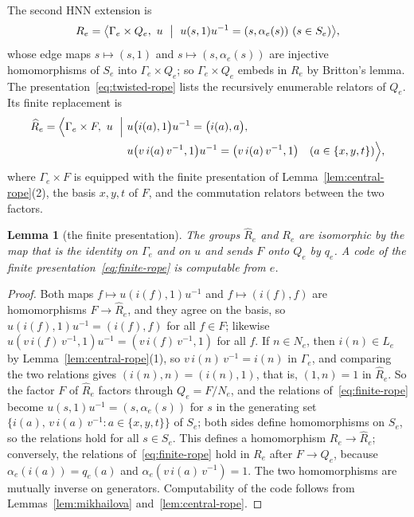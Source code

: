 \documentclass[11pt]{amsart}
\newtheorem{lemma}[theorem]{Lemma}
\theoremstyle{remark}
\theoremstyle{plain}
\begin{document}
The second HNN extension is
\begin{equation}\label{eq:twisted-rope}
 R_e=\bigl\langle\Gamma_e\times Q_e,\ u\ \bigm|\ u(s,1)u^{-1}=(s,\alpha_e(s))\ (s\in S_e)\bigr\rangle,
\end{equation}
whose edge maps $s\mapsto(s,1)$ and $s\mapsto(s,\alpha_e(s))$ are injective
homomorphisms of $S_e$ into $\Gamma_e\times Q_e$; so
$\Gamma_e\times Q_e$ embeds in $R_e$ by Britton's lemma.  The
presentation~\eqref{eq:twisted-rope} lists the recursively enumerable
relators of $Q_e$.  Its finite replacement is
\begin{equation}\label{eq:finite-rope}
\begin{aligned}
 \widehat R_e=\Bigl\langle\Gamma_e\times F,\ u\ \Bigm|\
 &u\bigl(i(a),1\bigr)u^{-1}=\bigl(i(a),a\bigr),\\
 &u\bigl(v\,i(a)\,v^{-1},1\bigr)u^{-1}=\bigl(v\,i(a)\,v^{-1},1\bigr)
 \quad(a\in\{x,y,t\})\Bigr\rangle,
\end{aligned}
\end{equation}
where $\Gamma_e\times F$ is equipped with the finite presentation of
Lemma~\ref{lem:central-rope}(2), the basis $x,y,t$ of $F$, and the
commutation relators between the two factors.

\begin{lemma}[the finite presentation]\label{lem:finite-rope}
The groups $\widehat R_e$ and $R_e$ are isomorphic by the map that is the
identity on $\Gamma_e$ and on $u$ and sends $F$ onto $Q_e$ by $q_e$.  A
code of the finite presentation~\eqref{eq:finite-rope} is computable
from $e$.
\end{lemma}

\begin{proof}
Both maps $f\mapsto u(i(f),1)u^{-1}$ and $f\mapsto(i(f),f)$ are
homomorphisms $F\to\widehat R_e$, and they agree on the basis, so
$u(i(f),1)u^{-1}=(i(f),f)$ for all $f\in F$; likewise
$u(v\,i(f)\,v^{-1},1)u^{-1}=(v\,i(f)\,v^{-1},1)$ for all $f$.  If
$n\in N_e$, then $i(n)\in L_e$ by Lemma~\ref{lem:central-rope}(1), so
$v\,i(n)\,v^{-1}=i(n)$ in $\Gamma_e$, and comparing the two relations
gives $(i(n),n)=(i(n),1)$, that is, $(1,n)=1$ in $\widehat R_e$.  So
the factor $F$ of $\widehat R_e$ factors through $Q_e=F/N_e$, and the
relations of~\eqref{eq:finite-rope} become $u(s,1)u^{-1}=(s,\alpha_e(s))$
for $s$ in the generating set $\{i(a),\,v\,i(a)\,v^{-1}:a\in\{x,y,t\}\}$
of $S_e$; both sides define homomorphisms on $S_e$, so the relations hold
for all $s\in S_e$.  This defines a homomorphism $R_e\to\widehat R_e$;
conversely, the relations of~\eqref{eq:finite-rope} hold in $R_e$ after
$F\to Q_e$, because $\alpha_e(i(a))=q_e(a)$ and
$\alpha_e(v\,i(a)\,v^{-1})=1$.  The two homomorphisms are mutually inverse
on generators.  Computability of the code follows from
Lemmas~\ref{lem:mikhailova} and~\ref{lem:central-rope}.
\end{proof}
\end{document}
